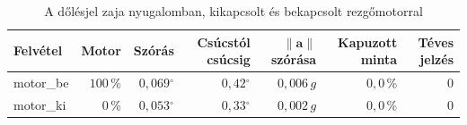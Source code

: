 \begin{table}[htbp]
  \centering
  \small
  \begin{tabular}{@{}lrrrrrr@{}}
    \toprule
    Felvétel & Motor & Szórás & Csúcstól csúcsig & $\lVert\mathbf{a}\rVert$ szórása & Kapuzott minta & Téves jelzés \\
    \midrule
    motor\_be & $100$\,\% & $0{,}069$$^\circ$ & $0{,}42$$^\circ$ & $0{,}006$\,$g$ & $0{,}0$\,\% & 0 \\
    motor\_ki & $0$\,\% & $0{,}053$$^\circ$ & $0{,}33$$^\circ$ & $0{,}002$\,$g$ & $0{,}0$\,\% & 0 \\
    \bottomrule
  \end{tabular}
  \caption{A dőlésjel zaja nyugalomban, kikapcsolt és bekapcsolt rezgőmotorral}
  \label{tab:zaj}
\end{table}
